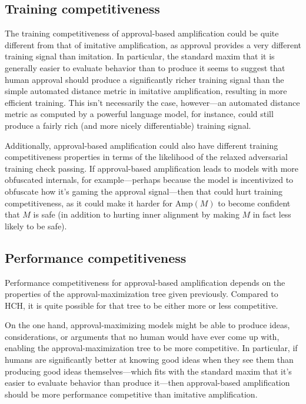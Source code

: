 \documentclass[
  onecolumn,
  natbib,
]{miri-tech-article}
\begin{document}
\subsection{Training competitiveness} The training competitiveness of approval-based amplification could be quite different from that of imitative amplification, as approval provides a very different training signal than imitation. In particular, the standard maxim that it is generally easier to evaluate behavior than to produce it seems to suggest that human approval should produce a significantly richer training signal than the simple automated distance metric in imitative amplification, resulting in more efficient training. This isn't necessarily the case, however---an automated distance metric as computed by a powerful language model, for instance, could still produce a fairly rich (and more nicely differentiable) training signal.

Additionally, approval-based amplification could also have different training competitiveness properties in terms of the likelihood of the relaxed adversarial training check passing. If approval-based amplification leads to models with more obfuscated internals, for example---perhaps because the model is incentivized to obfuscate how it's gaming the approval signal---then that could hurt training competitiveness, as it could make it harder for $\text{Amp}(M)$ to become confident that $M$ is safe (in addition to hurting inner alignment by making $M$ in fact less likely to be safe).

\subsection{Performance competitiveness} Performance competitiveness for approval-based amplification depends on the properties of the approval-maximization tree given previously. Compared to HCH, it is quite possible for that tree to be either more or less competitive.

On the one hand, approval-maximizing models might be able to produce ideas, considerations, or arguments that no human would have ever come up with, enabling the approval-maximization tree to be more competitive. In particular, if humans are significantly better at knowing good ideas when they see them than producing good ideas themselves---which fits with the standard maxim that it's easier to evaluate behavior than produce it---then approval-based amplification should be more performance competitive than imitative amplification.
\end{document}
